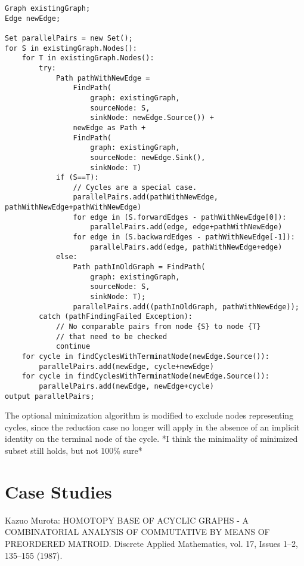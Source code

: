 \documentclass[runningheads]{llncs}
\begin{document}
\begin{verbatim}
Graph existingGraph;
Edge newEdge;

Set parallelPairs = new Set();
for S in existingGraph.Nodes():
    for T in existingGraph.Nodes():
        try:
            Path pathWithNewEdge = 
                FindPath(
                    graph: existingGraph, 
                    sourceNode: S,
                    sinkNode: newEdge.Source()) +
                newEdge as Path +
                FindPath(
                    graph: existingGraph, 
                    sourceNode: newEdge.Sink(), 
                    sinkNode: T)
            if (S==T):
                // Cycles are a special case.
                parallelPairs.add(pathWithNewEdge, pathWithNewEdge+pathWithNewEdge)
                for edge in (S.forwardEdges - pathWithNewEdge[0]):
                    parallelPairs.add(edge, edge+pathWithNewEdge)
                for edge in (S.backwardEdges - pathWithNewEdge[-1]):
                    parallelPairs.add(edge, pathWithNewEdge+edge)
            else:
                Path pathInOldGraph = FindPath(
                    graph: existingGraph, 
                    sourceNode: S, 
                    sinkNode: T);
                parallelPairs.add((pathInOldGraph, pathWithNewEdge));
        catch (pathFindingFailed Exception):
            // No comparable pairs from node {S} to node {T} 
            // that need to be checked
            continue
    for cycle in findCyclesWithTerminatNode(newEdge.Source()):
        parallelPairs.add(newEdge, cycle+newEdge)
    for cycle in findCyclesWithTerminatNode(newEdge.Source()):
        parallelPairs.add(newEdge, newEdge+cycle)
output parallelPairs;
\end{verbatim}

The optional minimization algorithm is modified to exclude nodes representing cycles, since the reduction case no longer will apply in the absence of an implicit identity on the terminal node of the cycle.
*I think the minimality of minimized subset still holds, but not 100\% sure*

\section{Case Studies}

%
%
%
% 
% 
%
\begin{thebibliography}{8}

Kazuo Murota: {HOMOTOPY BASE OF ACYCLIC GRAPHS - A COMBINATORIAL ANALYSIS OF COMMUTATIVE BY MEANS OF PREORDERED MATROID}. Discrete Applied Mathematics, vol. 17, Issues 1--2, 135--155 (1987).

\end{thebibliography}
\end{document}
